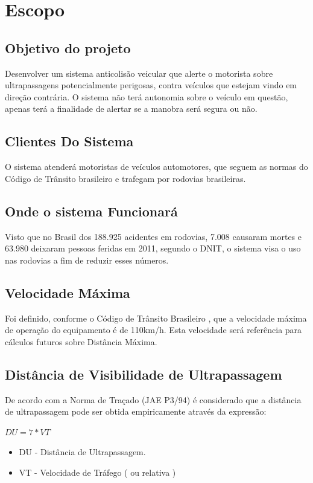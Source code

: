 \chapter[Escopo]{Escopo}

\section{Objetivo do projeto}
Desenvolver um sistema anticolisão veicular que alerte o motorista sobre ultrapassagens potencialmente perigosas, contra veículos que estejam vindo em direção contrária.
O sistema não terá autonomia sobre o veículo em questão, apenas terá a finalidade de alertar se a manobra será segura ou não.

\section{Clientes Do Sistema}
O sistema atenderá motoristas de veículos automotores, que seguem as normas do Código de Trânsito brasileiro e trafegam por rodovias brasileiras.

\section{Onde o sistema Funcionará}
Visto que no Brasil dos 188.925 acidentes em rodovias, 7.008 causaram mortes e 63.980 deixaram pessoas feridas em 2011, segundo o DNIT, o sistema visa o uso nas rodovias a fim de reduzir esses números. \cite{ministerio}

\section{Velocidade Máxima}
Foi definido, conforme o Código de Trânsito Brasileiro \cite{ctb}, que a velocidade máxima de operação do equipamento é de 110km/h.
Esta velocidade será referência para cálculos futuros sobre Distância Máxima.

\section{Distância de Visibilidade de Ultrapassagem}
De acordo com a Norma de Traçado (JAE P3/94) é considerado que a distância  de ultrapassagem pode ser obtida empiricamente através da expressão:

$DU = 7*VT$
\begin{itemize}
  \item DU - Distância de Ultrapassagem.
  \item VT - Velocidade de Tráfego ( ou relativa )
\end{itemize}

